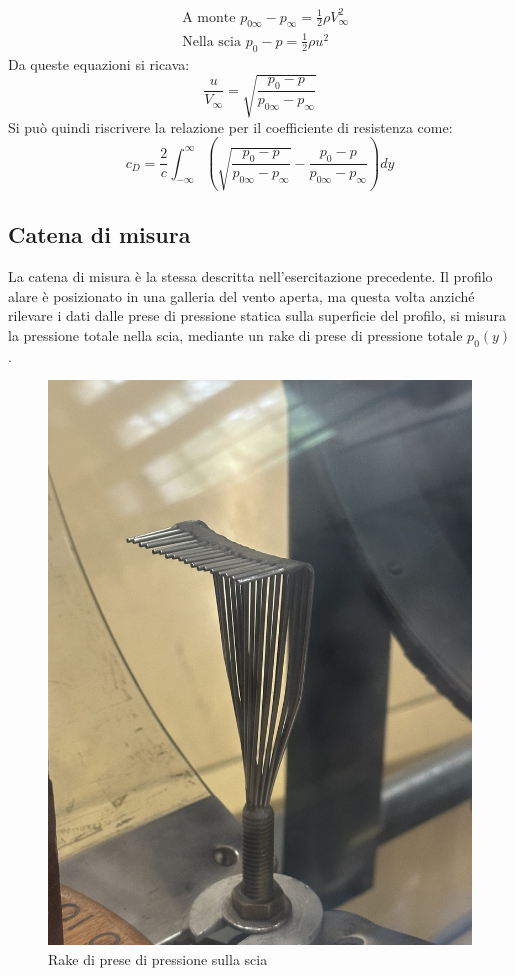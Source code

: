 \begin{equation*}
    \begin{split}
        &\text{A monte } p_{0\infty} - p_\infty = \frac 12 \rho V_\infty^2\\
        &\text{Nella scia } p_{0} - p = \frac 12 \rho u^2
    \end{split}
\end{equation*}
Da queste equazioni si ricava:
\begin{equation*}
    \frac{u}{V_\infty} = \sqrt{\frac{p_0 - p}{p_{0\infty} - p_\infty}}
\end{equation*}
Si può quindi riscrivere la relazione per il coefficiente di resistenza come:
\begin{equation*}
    c_D = \frac 2c \int_{-\infty}^{\infty} \left( \sqrt{\frac{p_0 - p}{p_{0\infty} - p_\infty}} - \frac{p_0 - p}{p_{0\infty} - p_\infty} \right) dy
\end{equation*}

\subsection{Catena di misura}
La catena di misura è la stessa descritta nell'esercitazione precedente. Il profilo alare è posizionato in una galleria del vento aperta, ma questa volta anziché rilevare i dati dalle prese di pressione statica sulla superficie del profilo, si misura la pressione totale nella scia, mediante un rake di prese di pressione totale $p_0(y)$.
\begin{figure}[H]
    \centering
    \includegraphics[width=.7\textwidth]{images/6/rake.jpg}
    \caption{Rake di prese di pressione sulla scia}
\end{figure}

